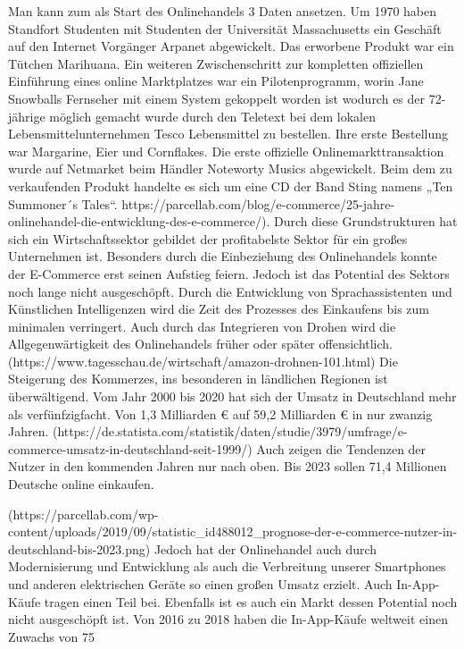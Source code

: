  Man kann zum als Start des Onlinehandels 3 Daten ansetzen. Um 1970 haben Standfort Studenten mit Studenten der Universität Massachusetts ein Geschäft auf den Internet Vorgänger Arpanet abgewickelt. Das erworbene Produkt war ein Tütchen Marihuana. 
Ein weiteren Zwischenschritt zur kompletten offiziellen Einführung eines online Marktplatzes war ein Pilotenprogramm, worin Jane Snowballs Fernseher mit einem System gekoppelt worden ist wodurch es der 72-jährige möglich gemacht wurde durch den Teletext bei dem lokalen Lebensmittelunternehmen Tesco Lebensmittel zu bestellen. Ihre erste Bestellung war Margarine, Eier und Cornflakes. 
Die erste offizielle Onlinemarkttransaktion wurde auf Netmarket beim Händler Noteworty Musics abgewickelt. Beim dem zu verkaufenden Produkt handelte es sich um eine CD der Band Sting namens „Ten Summoner´s Tales“. https://parcellab.com/blog/e-commerce/25-jahre-onlinehandel-die-entwicklung-des-e-commerce/). Durch diese Grundstrukturen hat sich ein Wirtschaftssektor gebildet der profitabelste Sektor für ein großes Unternehmen ist. Besonders durch die Einbeziehung des Onlinehandels konnte der E-Commerce erst seinen Aufstieg feiern. Jedoch ist das Potential des Sektors noch lange nicht ausgeschöpft. Durch die Entwicklung von Sprachassistenten und Künstlichen Intelligenzen wird die Zeit des Prozesses des Einkaufens bis zum minimalen verringert. Auch durch das Integrieren von Drohen wird die Allgegenwärtigkeit des Onlinehandels früher oder später offensichtlich. (https://www.tagesschau.de/wirtschaft/amazon-drohnen-101.html) Die Steigerung des Kommerzes, ins besonderen in ländlichen Regionen ist überwältigend. Vom Jahr 2000 bis 2020 hat sich der Umsatz in Deutschland mehr als verfünfzigfacht. Von 1,3 Milliarden € auf 59,2 Milliarden € in nur zwanzig Jahren. (https://de.statista.com/statistik/daten/studie/3979/umfrage/e-commerce-umsatz-in-deutschland-seit-1999/) Auch zeigen die Tendenzen der Nutzer in den kommenden Jahren nur nach oben. Bis 2023 sollen 71,4 Millionen Deutsche online einkaufen.       
 
(https://parcellab.com/wp-content/uploads/2019/09/statistic_id488012_prognose-der-e-commerce-nutzer-in-deutschland-bis-2023.png) 
Jedoch hat der Onlinehandel auch durch Modernisierung und Entwicklung als auch die Verbreitung unserer Smartphones und anderen elektrischen Geräte so einen großen Umsatz erzielt. Auch In-App-Käufe tragen einen Teil bei. Ebenfalls ist es auch ein Markt dessen Potential noch nicht ausgeschöpft ist. Von 2016 zu 2018 haben die In-App-Käufe weltweit einen Zuwachs von 75 %
   
